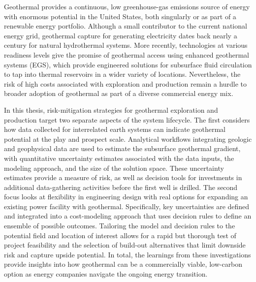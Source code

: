 % 
% 
%
Geothermal provides a continuous, low greenhouse-gas emissions source of energy with enormous potential in the United States, both singularly or as part of a renewable energy portfolio. Although a small contributor to the current national energy grid, geothermal capture for generating electricity dates back nearly a century for natural hydrothermal systems. More recently, technologies at various readiness levels give the promise of geothermal access using enhanced geothermal systems (EGS), which provide engineered solutions for subsurface fluid circulation to tap into thermal reservoirs in a wider variety of locations. Nevertheless, the risk of high costs associated with exploration and production remain a hurdle to broader adoption of geothermal as part of a diverse commercial energy mix.

In this thesis, risk-mitigation strategies for geothermal exploration and production target two separate aspects of the system lifecycle. The first considers how data collected for interrelated earth systems can indicate geothermal potential at the play and prospect scale. Analytical workflows integrating geologic and geophysical data are used to estimate the subsurface geothermal gradient, with quantitative uncertainty estimates associated with the data inputs, the modeling approach, and the size of the solution space. These uncertainty estimates provide a measure of risk, as well as decision tools for investments in additional data-gathering activities before the first well is drilled. The second focus looks at flexibility in engineering design with real options for expanding an existing power facility with geothermal. Specifically, key uncertainties are defined and integrated into a cost-modeling approach that uses decision rules to define an ensemble of possible outcomes. Tailoring the model and decision rules to the potential field and location of interest allows for a rapid but thorough test of project feasibility and the selection of build-out alternatives that limit downside risk and capture upside potential. In total, the learnings from these investigations provide insights into how geothermal can be a commercially viable, low-carbon option as energy companies navigate the ongoing energy transition.